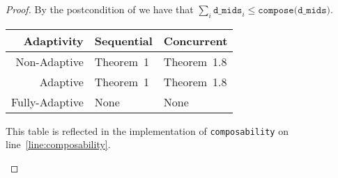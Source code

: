 \documentclass{article}
\begin{document}
\begin{proof}
  By the postcondition of  we have that $\sum_i \texttt{d\_mids}_i \le \texttt{compose(d\_mids)}$.

  \begin{center}
    \begin{tabular}{ r | l l }
      Adaptivity & Sequential & Concurrent \\ 
      \hline
      Non-Adaptive & Theorem~1\cite{dwork2006calibrating} & Theorem~1.8\cite{vadhan2021concurrent} \\  
      Adaptive & Theorem~1\cite{dwork2006calibrating} & Theorem~1.8\cite{vadhan2021concurrent} \\
      Fully-Adaptive & None & None
    \end{tabular}

    This table is reflected in the implementation of \texttt{composability} on line~\ref{line:composability}.
  \end{center}
  
\end{proof}



\end{document}
